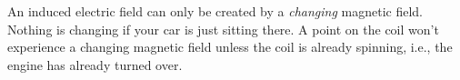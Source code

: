 An induced electric field can only be created by a \emph{changing} magnetic
field. Nothing is changing if your car is just sitting there. A point on the
coil won't experience a changing magnetic field unless the coil is already
spinning, i.e., the engine has already turned over.



